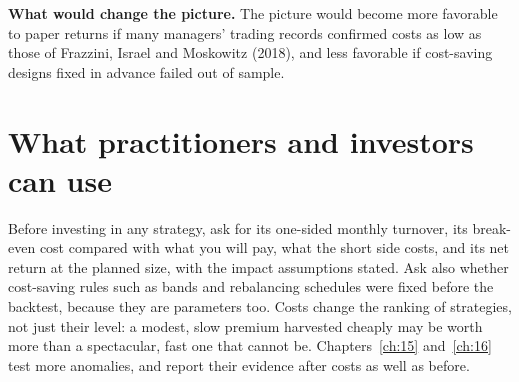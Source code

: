 \textbf{What would change the picture.} The picture would become more favorable to paper returns if many managers' trading records confirmed costs as low as those of Frazzini, Israel and Moskowitz (2018), and less favorable if cost-saving designs fixed in advance failed out of sample.

\section{What practitioners and investors can use}
\label{sec:17-investors}

Before investing in any strategy, ask for its one-sided monthly turnover, its break-even cost compared with what you will pay, what the short side costs, and its net return at the planned size, with the impact assumptions stated. Ask also whether cost-saving rules such as bands and rebalancing schedules were fixed before the backtest, because they are parameters too. Costs change the ranking of strategies, not just their level: a modest, slow premium harvested cheaply may be worth more than a spectacular, fast one that cannot be. Chapters~\ref{ch:15} and~\ref{ch:16} test more anomalies, and report their evidence after costs as well as before.

\makeatletter
{}
\makeatother

